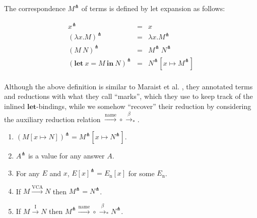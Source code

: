 \documentclass{llncs}
\newcommand{\LET}[3]{\mathbf{let}~#1=#2~\mathbf{in}~#3}
\newcommand{\EXPANDLET}[1]{#1^\pitchfork}
\newcommand{\FULLBETA}{\xrightarrow{\beta}}
\newcommand{\CALLBYNAME}{\xrightarrow{\mathrm{name}}}
\newcommand{\CALLBYNEEDI}{\xrightarrow{\mathrm{I}}}
\newcommand{\CALLBYNEEDVCA}{\xrightarrow{\mathrm{VCA}}}
\newcommand{\RTCLOS}[1]{#1_*}
\begin{document}
The correspondence $\EXPANDLET{M}$ of terms is defined by let expansion as follows:
\begin{definition}\label{def:expandlet}
	\[ \begin{array}{rcl}
		\EXPANDLET{x} & = & x \\
		\EXPANDLET{(\lambda x. M)} & = & \lambda x. \EXPANDLET{M} \\
		\EXPANDLET{(M~N)} & = & \EXPANDLET{M}~\EXPANDLET{N} \\
		\EXPANDLET{(\LET{x}{M}{N})} & = & \EXPANDLET{N}[x \mapsto \EXPANDLET{M}] \\
	\end{array} \]
\end{definition}
%
Although the above definition is similar to Maraist et al. \cite{Maraist98}, they annotated terms and reductions with what they call ``marks'', which they use to keep track of the inlined $\mathbf{let}$-bindings, while we somehow ``recover'' their reduction by considering the auxiliary reduction relation ${\CALLBYNAME}\circ{\RTCLOS{\FULLBETA}}$.
%
\begin{lemma}\label{lemma:single-step-soundness}
	\begin{enumerate}
		\item $\EXPANDLET{(M[x \mapsto N])} = \EXPANDLET{M}[x \mapsto \EXPANDLET{N}]$.
		\item $\EXPANDLET{A}$ is a value for any answer $A$. \label{enum:value-answer}
		\item For any $E$ and $x$, $\EXPANDLET{E[x]} = E_\mathrm{n}[x]$ for some $E_\mathrm{n}$. \label{enum:stuck}
		\item If $M \CALLBYNEEDVCA N$ then $\EXPANDLET{M} = \EXPANDLET{N}$. \label{enum:administrative}
		\item If $M \CALLBYNEEDI N$ then $\EXPANDLET{M} {\CALLBYNAME}\circ{\RTCLOS{\FULLBETA}} \EXPANDLET{N}$. \label{enum:actual}
	\end{enumerate}
\end{lemma}
%
\end{document}
